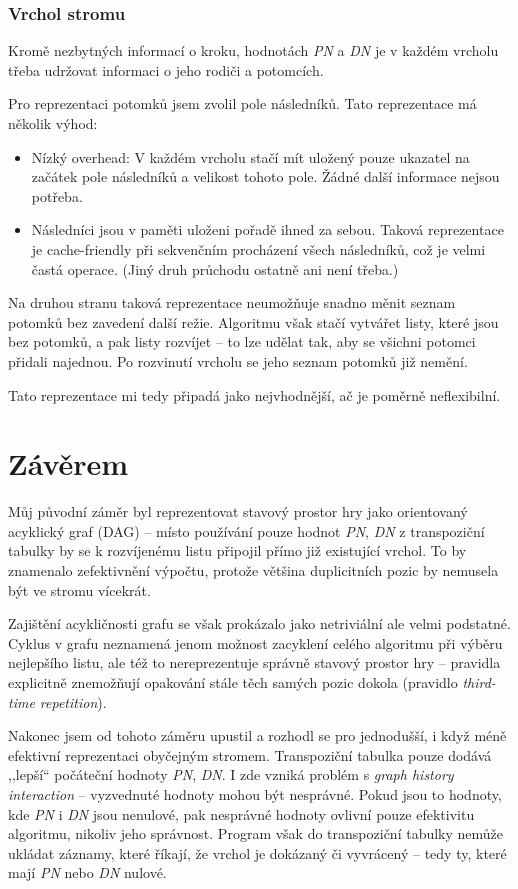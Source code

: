 \documentclass{article}
\begin{document}
\subsubsection{Vrchol stromu}
Kromě nezbytných informací o kroku, hodnotách \emph{PN} a \emph{DN} je v každém vrcholu třeba udržovat informaci o jeho
rodiči a potomcích.

Pro reprezentaci potomků jsem zvolil pole následníků. Tato reprezentace má několik výhod:\begin{itemize}
  \item Nízký overhead: V každém vrcholu stačí mít uložený pouze ukazatel na začátek pole následníků a velikost tohoto
  pole. Žádné další informace nejsou potřeba.
  \item Následníci jsou v paměti uloženi pořadě ihned za sebou. Taková reprezentace je cache-friendly při sekvenčním
  procházení všech následníků, což je velmi častá operace. (Jiný druh průchodu ostatně ani není třeba.)
\end{itemize}

Na druhou stranu taková reprezentace neumožňuje snadno měnit seznam potomků bez zavedení další režie. Algoritmu však
stačí vytvářet listy, které jsou bez potomků, a pak listy rozvíjet -- to lze udělat tak, aby se všichni potomci přidali
najednou. Po rozvinutí vrcholu se jeho seznam potomků již nemění.

Tato reprezentace mi tedy připadá jako nejvhodnější, ač je poměrně neflexibilní.

\section{Závěrem}
Můj původní záměr byl reprezentovat stavový prostor hry jako orientovaný acyklický graf (DAG) -- místo používání pouze
hodnot \emph{PN}, \emph{DN} z transpoziční tabulky by se k rozvíjenému listu připojil přímo již existující vrchol. To by
znamenalo zefektivnění výpočtu, protože většina duplicitních pozic by nemusela být ve stromu vícekrát.

Zajištění acykličnosti grafu se však prokázalo jako netriviální ale velmi podstatné. Cyklus v grafu neznamená jenom
možnost zacyklení celého algoritmu při výběru nejlepšího listu, ale též to nereprezentuje správně stavový prostor hry --
pravidla explicitně znemožňují opakování stále těch samých pozic dokola (pravidlo \emph{third-time repetition}).

Nakonec jsem od tohoto záměru upustil a rozhodl se pro jednodušší, i když méně efektivní reprezentaci obyčejným
stromem. Transpoziční tabulka pouze dodává ,,lepší`` počáteční hodnoty \emph{PN}, \emph{DN}. I zde vzniká problém s
\emph{graph history interaction} -- vyzvednuté hodnoty mohou být nesprávné. Pokud jsou to hodnoty, kde \emph{PN} i \emph{DN}
jsou nenulové, pak nesprávné hodnoty ovlivní pouze efektivitu algoritmu, nikoliv jeho správnost. Program však do transpoziční
tabulky nemůže ukládat záznamy, které říkají, že vrchol je dokázaný či vyvrácený -- tedy ty, které mají \emph{PN} nebo \emph{DN}
nulové.
\end{document}
